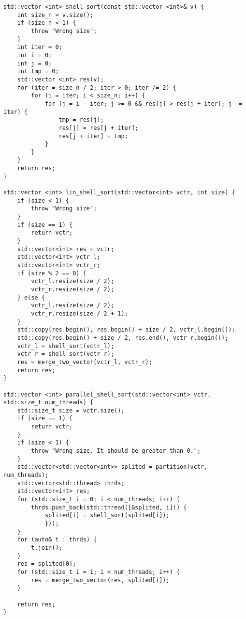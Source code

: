 \documentclass{report}
\begin{document}
\begin{lstlisting}
std::vector <int> shell_sort(const std::vector <int>& v) {
    int size_n = v.size();
    if (size_n < 1) {
        throw "Wrong size";
    }
    int iter = 0;
    int i = 0;
    int j = 0;
    int tmp = 0;
    std::vector <int> res(v);
    for (iter = size_n / 2; iter > 0; iter /= 2) {
        for (i = iter; i < size_n; i++) {
            for (j = i - iter; j >= 0 && res[j] > res[j + iter]; j -= iter) {
                tmp = res[j];
                res[j] = res[j + iter];
                res[j + iter] = tmp;
            }
        }
    }
    return res;
}

std::vector <int> lin_shell_sort(std::vector<int> vctr, int size) {
    if (size < 1) {
        throw "Wrong size";
    }
    if (size == 1) {
        return vctr;
    }
    std::vector<int> res = vctr;
    std::vector<int> vctr_l;
    std::vector<int> vctr_r;
    if (size % 2 == 0) {
        vctr_l.resize(size / 2);
        vctr_r.resize(size / 2);
    } else {
        vctr_l.resize(size / 2);
        vctr_r.resize(size / 2 + 1);
    }
    std::copy(res.begin(), res.begin() + size / 2, vctr_l.begin());
    std::copy(res.begin() + size / 2, res.end(), vctr_r.begin());
    vctr_l = shell_sort(vctr_l);
    vctr_r = shell_sort(vctr_r);
    res = merge_two_vector(vctr_l, vctr_r);
    return res;
}

std::vector <int> parallel_shell_sort(std::vector<int> vctr, std::size_t num_threads) {
    std::size_t size = vctr.size();
    if (size == 1) {
        return vctr;
    }
    if (size < 1) {
        throw "Wrong size. It should be greater than 0.";
    }
    std::vector<std::vector<int>> splited = partition(vctr, num_threads);
    std::vector<std::thread> thrds;
    std::vector<int> res;
    for (std::size_t i = 0; i < num_threads; i++) {
        thrds.push_back(std::thread([&splited, i]() {
            splited[i] = shell_sort(splited[i]);
            }));
    }
    for (auto& t : thrds) {
        t.join();
    }
    res = splited[0];
    for (std::size_t i = 1; i < num_threads; i++) {
        res = merge_two_vector(res, splited[i]);
    }

    return res;
}
\end{lstlisting}
\end{document}
